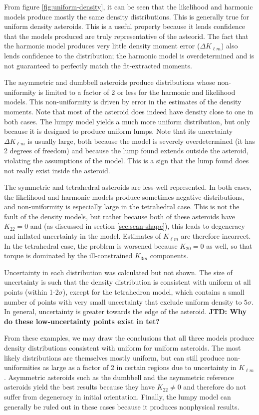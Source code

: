 \documentclass[fleqn,usenatbib]{mnras}
\newcommand{\jtd}[1]{ {\bf{\color{red} JTD: #1}} }
\begin{document}
From figure \ref{fig:uniform-density}, it can be seen that the likelihood and harmonic models produce mostly the same density distributions. This is generally true for uniform density asteroids. This is a useful property because it lends confidence that the models produced are truly representative of the asteorid. The fact that the harmonic model produces very little density moment error ($\Delta K_{\ell m}$) also lends confidence to the distribution; the harmonic model is overdetermined and is not guaranteed to perfectly match the fit-extracted moments.

The asymmetric and dumbbell asteroids produce distributions whose non-uniformity is limited to a factor of 2 or less for the harmonic and likelihood models. This non-uniformity is driven by error in the estimates of the density moments. Note that most of the asteroid does indeed have density close to one in both cases. The lumpy model yields a much more uniform distribution, but only because it is designed to produce uniform lumps. Note that its uncertainty $\Delta K_{\ell m}$ is usually large, both because the model is severely overdetermined (it has 2 degrees of freedom) and because the lump found extends outside the asteroid, violating the assumptions of the model. This is a sign that the lump found does not really exist inside the asteroid.

The symmetric and tetrahedral asteroids are less-well represented. In both cases, the likelihood and harmonic models produce sometimes-negative distributions, and non-uniformity is especially large in the tetrahedral case. This is not the fault of the density models, but rather because both of these asteroids have $K_{22} = 0$ and (as discussed in section \ref{sec:scan-shape}), this leads to degeneracy and inflated uncertainty in the model. Estimates of $K_{\ell m}$ are therefore incorrect. In the tetrahedral case, the problem is worsened because $K_{20}=0$ as well, so that torque is dominated by the ill-constrained $K_{3m}$ components.

Uncertainty in each distribution was calculated but not shown. The size of uncertainty is such that the density distribution is consistent with uniform at all points (within 1-2$\sigma$), except for the tetrahedron model, which contains a small number of points with very small uncertainty that exclude uniform density to $5\sigma$. In general, uncertainty is greater towards the edge of the asteroid. \jtd{Why do these low-uncertainty points exist in tet?}

From these examples, we may draw the conclusions that all three models produce density distributions consistent with uniform for uniform asteroids. The most likely distributions are themselves mostly uniform, but can still produce non-uniformities as large as a factor of 2 in certain regions due to uncertainty in $K_{\ell m}$. Asymmetric asteroids such as the dumbbell and the asymmetric reference asteroids yield the best results because they have $K_{22} \neq 0$ and therefore do not suffer from degeneracy in initial orientation. Finally, the lumpy model can generally be ruled out in these cases because it produces nonphysical results.
\end{document}
